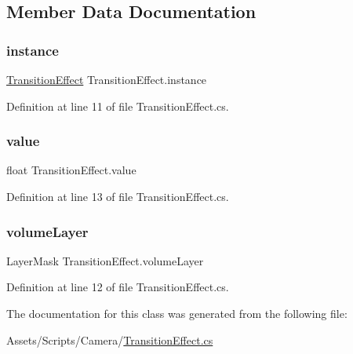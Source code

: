 \subsection{Member Data Documentation}
\mbox{\label{class_transition_effect_af0621c8a766eacce2d6159869ebf35b6}} 
\subsubsection{\texorpdfstring{instance}{instance}}
{\footnotesize\ttfamily \mbox{\hyperlink{class_transition_effect}{Transition\+Effect}} Transition\+Effect.\+instance\hspace{0.3cm}{\ttfamily [static]}}



Definition at line 11 of file Transition\+Effect.\+cs.

\mbox{\label{class_transition_effect_af7fc803c35993244ecdcfd9093deeee0}} 
\subsubsection{\texorpdfstring{value}{value}}
{\footnotesize\ttfamily float Transition\+Effect.\+value}



Definition at line 13 of file Transition\+Effect.\+cs.

\mbox{\label{class_transition_effect_a7ff07fcdfaa8c25fcf118e0eb6a7cd3c}} 
\subsubsection{\texorpdfstring{volume\+Layer}{volumeLayer}}
{\footnotesize\ttfamily Layer\+Mask Transition\+Effect.\+volume\+Layer}



Definition at line 12 of file Transition\+Effect.\+cs.



The documentation for this class was generated from the following file\+:\begin{DoxyCompactItemize}
\item 
Assets/\+Scripts/\+Camera/\mbox{\hyperlink{_transition_effect_8cs}{Transition\+Effect.\+cs}}\end{DoxyCompactItemize}
